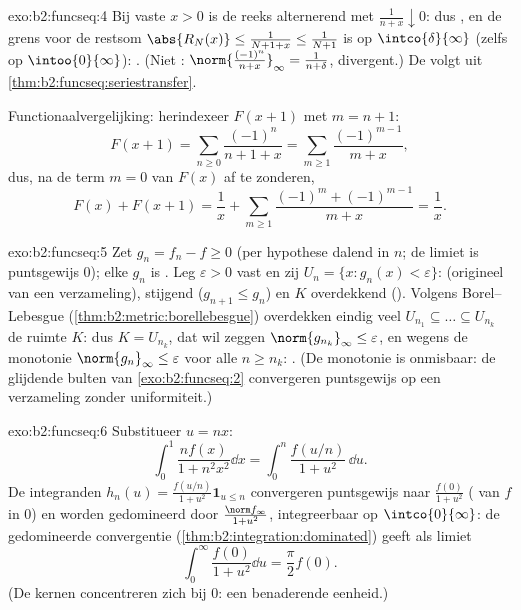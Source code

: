 \begin{solution}{exo:b2:funcseq:4}
Bij vaste $x > 0$ is de reeks alternerend met $\frac{1}{n + x}
\downarrow 0$: dus , en de grens voor de
restsom $\abs{R_N(x)} \leq \frac{1}{N + 1 + x} \leq \frac{1}{N+1}$
is \emph{} op $\intco{\delta}{\infty}$ (zelfs op
$\intoo{0}{\infty}$): . (Niet :
$\norm{\frac{(-1)^n}{n+x}}_\infty = \frac{1}{n + \delta}$,
divergent.) De  volgt uit
\cref{thm:b2:funcseq:seriestransfer}.

Functionaalvergelijking: herindexeer $F(x + 1)$ met $m = n + 1$:
\[
F(x+1) = \sum_{n\geq0} \frac{(-1)^n}{n + 1 + x}
= \sum_{m\geq1}\frac{(-1)^{m-1}}{m+x} ,
\]
dus, na de term $m = 0$ van $F(x)$ af te zonderen,
\[
F(x) + F(x+1)
= \frac{1}{x} + \sum_{m\geq1}
\frac{(-1)^m + (-1)^{m-1}}{m+x} = \frac1x .
\]
\end{solution}

\begin{solution}{exo:b2:funcseq:5}
Zet $g_n = f_n - f \geq 0$ (per hypothese dalend in $n$; de limiet
is puntsgewijs $0$); elke $g_n$ is . Leg $\varepsilon > 0$
vast en zij $U_n = \{x : g_n(x) < \varepsilon\}$:  (origineel
van een  verzameling), stijgend ($g_{n+1} \leq g_n$) en $K$
overdekkend (). Volgens
Borel--Lebesgue (\cref{thm:b2:metric:borellebesgue}) overdekken
eindig veel $U_{n_1} \subseteq \dots \subseteq U_{n_k}$ de ruimte
$K$: dus $K = U_{n_k}$, dat wil zeggen $\norm{g_{n_k}}_\infty \leq
\varepsilon$, en wegens de monotonie $\norm{g_n}_\infty \leq
\varepsilon$ voor alle $n \geq n_k$: . (De
monotonie is onmisbaar: de glijdende bulten van
\cref{exo:b2:funcseq:2} convergeren puntsgewijs op een 
verzameling zonder uniformiteit.)
\end{solution}

\begin{solution}{exo:b2:funcseq:6}
Substitueer $u = nx$:
\[
\int_0^1 \frac{n f(x)}{1 + n^2x^2}\dd x
= \int_0^n \frac{f(u/n)}{1 + u^2}\,\dd u .
\]
De integranden $h_n(u) = \frac{f(u/n)}{1+u^2}\mathbf{1}_{u \leq n}$
convergeren puntsgewijs naar $\frac{f(0)}{1+u^2}$ ( van
$f$ in $0$) en worden gedomineerd door $\frac{\norm f_\infty}{1 +
u^2}$, integreerbaar op $\intco{0}{\infty}$: de gedomineerde
convergentie (\cref{thm:b2:integration:dominated}) geeft als
limiet
\[
\int_0^\infty \frac{f(0)}{1 + u^2}\dd u = \frac{\pi}{2} f(0) .
\]
(De kernen concentreren zich bij $0$: een benaderende eenheid.)
\end{solution}

